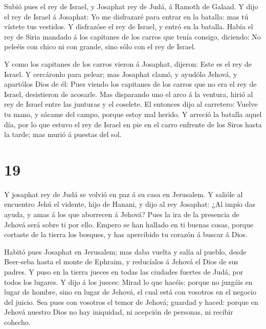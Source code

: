  Subió pues el rey de Israel, y Josaphat rey de Judá, á
Ramoth de Galaad.  Y dijo el rey de Israel á Josaphat: Yo
me disfrazaré para entrar en la batalla: mas tú vístete tus vestidos. Y
disfrazóse el rey de Israel, y entró en la batalla.  Había
el rey de Siria mandado á los capitanes de los carros que tenía consigo,
diciendo: No peleéis con chico ni con grande, sino sólo con el rey de
Israel.

 Y como los capitanes de los carros vieron á Josaphat,
dijeron: Este es el rey de Israel. Y cercáronlo para pelear; mas
Josaphat clamó, y ayudólo Jehová, y apartólos Dios de él: 
Pues viendo los capitanes de los carros que no era el rey de Israel,
desistieron de acosarle.  Mas disparando uno el arco á la
ventura, hirió al rey de Israel entre las junturas y el coselete. El
entonces dijo al carretero: Vuelve tu mano, y sácame del campo, porque
estoy mal herido.  Y arreció la batalla aquel día, por lo
que estuvo el rey de Israel en pie en el carro enfrente de los Siros
hasta la tarde; mas murió á puestas del sol.

\hypertarget{section-18}{%
\section{19}\label{section-18}}

 Y josaphat rey de Judá se volvió en paz á su casa en
Jerusalem.  Y salióle al encuentro Jehú el vidente, hijo de
Hanani, y dijo al rey Josaphat: ¿Al impío das ayuda, y amas á los que
aborrecen á Jehová? Pues la ira de la presencia de Jehová será sobre ti
por ello.  Empero se han hallado en ti buenas cosas, porque
cortaste de la tierra los bosques, y has apercibido tu corazón á buscar
á Dios.

 Habitó pues Josaphat en Jerusalem; mas daba vuelta y salía
al pueblo, desde Beer-seba hasta el monte de Ephraim, y reducíalos á
Jehová el Dios de sus padres.  Y puso en la tierra jueces en
todas las ciudades fuertes de Judá, por todos los lugares. 
Y dijo á los jueces: Mirad lo que hacéis: porque no juzgáis en lugar de
hombre, sino en lugar de Jehová, el cual está con vosotros en el negocio
del juicio.  Sea pues con vosotros el temor de Jehová;
guardad y haced: porque en Jehová nuestro Dios no hay iniquidad, ni
acepción de personas, ni recibir cohecho.

